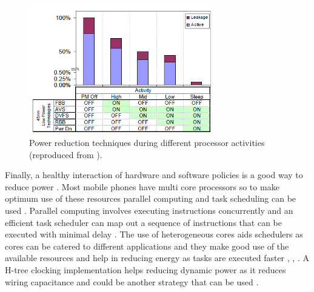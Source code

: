\documentclass[journal]{IEEEtran}
\begin{document}
	\begin{figure}[h]
	   \centering
	   \includegraphics[width = 8cm]{ABBTech}
	   \caption{Power reduction techniques during different processor activities (reproduced from \cite{ABB}).}
	   \label{Figure:ABBTech}
	\end{figure}	
	\FloatBarrier

Finally, a healthy interaction of hardware and software policies is a good way to reduce power \cite{HD/SF}. Most mobile phones have multi core processors so to make optimum use of these resources parallel computing and task scheduling can be used \cite{HD/SF}. Parallel computing involves executing instructions concurrently and an efficient task scheduler can map out a sequence of instructions that can be executed with minimal delay \cite{HD/SF}. The use of heterogeneous cores aids schedulers as cores can be catered to different applications and they make good use of the available resources and help in reducing energy as tasks are executed faster \cite{HD/SF}, \cite{Heterogeneous}, \cite{HeterogenousFuture}. A H-tree clocking implementation helps reducing dynamic power as it reduces wiring capacitance and could be another strategy that can be used \cite{Heterogeneous}.
\end{document}
